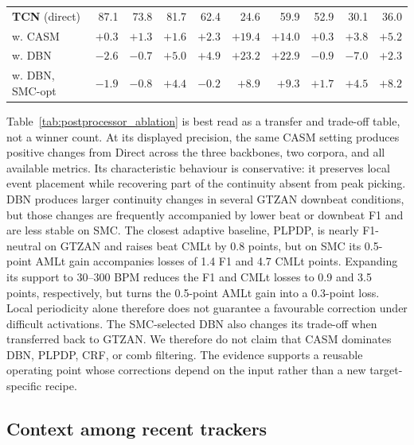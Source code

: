 \documentclass{article}
\begin{document}
\begin{table}[t]
{\begin{tabular}{l|rrr|rrr|rrr}
\midrule
\textbf{TCN} (direct) \cite{bock2020deconstruct}
& 87.1 & 73.8 & 81.7
& 62.4 & 24.6 & 59.9
& 52.9 & 30.1 & 36.0 \\
\rowcolor{gray!10}
\quad w. CASM
& $\mathbf{+0.3}$ & $\mathbf{+1.3}$ & $+1.6$
& $+2.3$ & $+19.4$ & $+14.0$
& $+0.3$ & $+3.8$ & $+5.2$ \\
\quad w. DBN
& $-2.6$ & $-0.7$ & $\mathbf{+5.0}$
& $\mathbf{+4.9}$ & $\mathbf{+23.2}$ & $\mathbf{+22.9}$
& $-0.9$ & $-7.0$ & $+2.3$ \\
\rowcolor{gray!10}
\quad w. DBN, SMC-opt
& $-1.9$ & $-0.8$ & $+4.4$
& $-0.2$ & $+8.9$ & $+9.3$
& $\mathbf{+1.7}$ & $\mathbf{+4.5}$ & $\mathbf{+8.2}$ \\
\bottomrule
\end{tabular}%
}
\endgroup
\end{table}

Table~\ref{tab:postprocessor_ablation} is best read as a transfer and
trade-off table, not a winner count. At its displayed precision, the same
CASM setting produces positive changes from Direct across the three
backbones, two corpora, and all available metrics. Its characteristic
behaviour is conservative: it preserves local event placement while recovering
part of the continuity absent from peak picking. DBN produces larger
continuity changes in several GTZAN downbeat conditions, but those changes are
frequently accompanied by lower beat or downbeat F1 and are less stable on
SMC. The closest adaptive baseline, PLPDP, is nearly F1-neutral on GTZAN and
raises beat CMLt by 0.8 points, but on SMC its 0.5-point AMLt gain accompanies
losses of 1.4 F1 and 4.7 CMLt points. Expanding its support to 30--300 BPM
reduces the F1 and CMLt losses to 0.9 and 3.5 points, respectively, but turns
the 0.5-point AMLt gain into a 0.3-point loss. Local periodicity alone therefore
does not guarantee a favourable correction under difficult activations. The
SMC-selected DBN also changes its
trade-off when transferred back to GTZAN. We therefore do not claim that CASM
dominates DBN, PLPDP, CRF, or comb filtering. The evidence supports a reusable
operating point whose corrections depend on the input rather than a new
target-specific recipe.

\subsection{Context among recent trackers}
\end{document}

